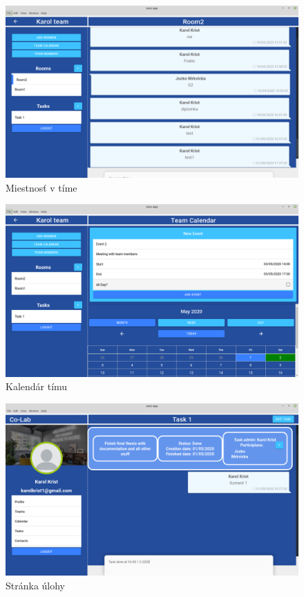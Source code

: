 \begin{figure}[H]
    \centering
    \includegraphics[scale=0.30]{img/design/room.png}
    \caption{Miestnosť v tíme}
    \label{fig:room}
\end{figure}

\begin{figure}[H]
    \centering
    \includegraphics[scale=0.30]{img/design/team_cal.png}
    \caption{Kalendár tímu}
    \label{fig:team_cal}
\end{figure}

\begin{figure}[H]
    \centering
    \includegraphics[scale=0.30]{img/design/task1.png}
    \caption{Stránka úlohy}
    \label{fig:task}
\end{figure}

